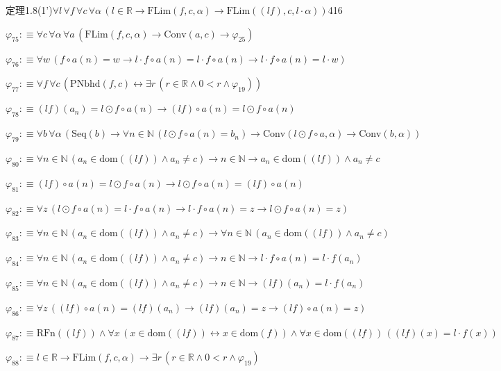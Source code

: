 \begin{fullproof}{定理1.8(1')}{$\forall l\,\forall f\,\forall c\,\forall \alpha\,(l \in \mathbb{R} \to \mathrm{FLim}(f,c,\alpha) \to \mathrm{FLim}((l f),c,l \cdot \alpha))$}{416}
\begin{abbrevlist}
\item $\varphi_{75} :\equiv \forall c\,\forall \alpha\,\forall a\,(\mathrm{FLim}(f,c,\alpha) \to \mathrm{Conv}(a,c) \to \varphi_{25})$
\item $\varphi_{76} :\equiv \forall w\,(f \circ a(n) = w \to l \cdot f \circ a(n) = l \cdot f \circ a(n) \to l \cdot f \circ a(n) = l \cdot w)$
\item $\varphi_{77} :\equiv \forall f\,\forall c\,(\mathrm{PNbhd}(f,c) \leftrightarrow \exists r\,(r \in \mathbb{R} \land 0 < r \land \varphi_{19}))$
\item $\varphi_{78} :\equiv (l f)(a_{n}) = l \odot f \circ a(n) \to (l f) \circ a(n) = l \odot f \circ a(n)$
\item $\varphi_{79} :\equiv \forall b\,\forall \alpha\,(\mathrm{Seq}(b) \to \forall n \in \mathbb{N}\,(l \odot f \circ a(n) = b_{n}) \to \mathrm{Conv}(l \odot f \circ a,\alpha) \to \mathrm{Conv}(b,\alpha))$
\item $\varphi_{80} :\equiv \forall n \in \mathbb{N}\,(a_{n} \in \mathrm{dom}((l f)) \land a_{n} \neq c) \to n \in \mathbb{N} \to a_{n} \in \mathrm{dom}((l f)) \land a_{n} \neq c$
\item $\varphi_{81} :\equiv (l f) \circ a(n) = l \odot f \circ a(n) \to l \odot f \circ a(n) = (l f) \circ a(n)$
\item $\varphi_{82} :\equiv \forall z\,(l \odot f \circ a(n) = l \cdot f \circ a(n) \to l \cdot f \circ a(n) = z \to l \odot f \circ a(n) = z)$
\item $\varphi_{83} :\equiv \forall n \in \mathbb{N}\,(a_{n} \in \mathrm{dom}((l f)) \land a_{n} \neq c) \to \forall n \in \mathbb{N}\,(a_{n} \in \mathrm{dom}((l f)) \land a_{n} \neq c)$
\item $\varphi_{84} :\equiv \forall n \in \mathbb{N}\,(a_{n} \in \mathrm{dom}((l f)) \land a_{n} \neq c) \to n \in \mathbb{N} \to l \cdot f \circ a(n) = l \cdot f(a_{n})$
\item $\varphi_{85} :\equiv \forall n \in \mathbb{N}\,(a_{n} \in \mathrm{dom}((l f)) \land a_{n} \neq c) \to n \in \mathbb{N} \to (l f)(a_{n}) = l \cdot f(a_{n})$
\item $\varphi_{86} :\equiv \forall z\,((l f) \circ a(n) = (l f)(a_{n}) \to (l f)(a_{n}) = z \to (l f) \circ a(n) = z)$
\item $\varphi_{87} :\equiv \mathrm{RFn}((l f)) \land \forall x\,(x \in \mathrm{dom}((l f)) \leftrightarrow x \in \mathrm{dom}(f)) \land \forall x \in \mathrm{dom}((l f))\,((l f)(x) = l \cdot f(x))$
\item $\varphi_{88} :\equiv l \in \mathbb{R} \to \mathrm{FLim}(f,c,\alpha) \to \exists r\,(r \in \mathbb{R} \land 0 < r \land \varphi_{19})$

\end{abbrevlist}
\end{fullproof}
